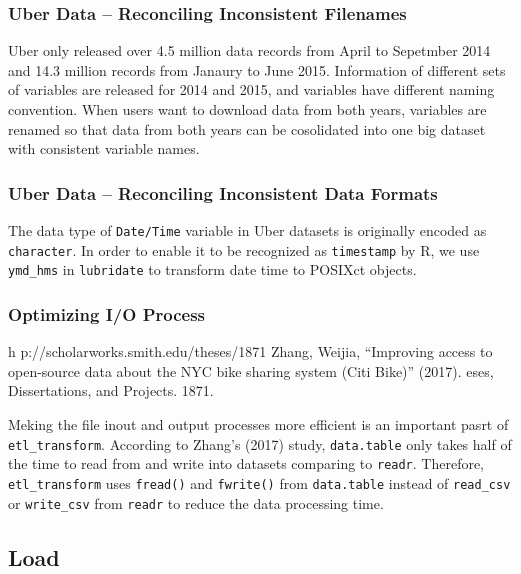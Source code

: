 \documentclass[12pt,twoside]{reedthesis}
\theoremstyle{definition}
\theoremstyle{definition}
\theoremstyle{definition}
\theoremstyle{remark}
\begin{document}
\subsubsection{Uber Data -- Reconciling Inconsistent
Filenames}\label{uber-data-reconciling-inconsistent-filenames}

Uber only released over 4.5 million data records from April to Sepetmber
2014 and 14.3 million records from Janaury to June 2015. Information of
different sets of variables are released for 2014 and 2015, and
variables have different naming convention. When users want to download
data from both years, variables are renamed so that data from both years
can be cosolidated into one big dataset with consistent variable names.

\subsubsection{Uber Data -- Reconciling Inconsistent Data
Formats}\label{uber-data-reconciling-inconsistent-data-formats}

The data type of \texttt{Date/Time} variable in Uber datasets is
originally encoded as \texttt{character}. In order to enable it to be
recognized as \texttt{timestamp} by R, we use \texttt{ymd\_hms} in
\texttt{lubridate} to transform date time to POSIXct objects.

\subsubsection{Optimizing I/O Process}\label{optimizing-io-process}

h p://scholarworks.smith.edu/theses/1871 Zhang, Weijia, ``Improving
access to open-source data about the NYC bike sharing system (Citi
Bike)'' (2017). eses, Dissertations, and Projects. 1871.

Meking the file inout and output processes more efficient is an
important pasrt of \texttt{etl\_transform}. According to Zhang's (2017)
study, \texttt{data.table} only takes half of the time to read from and
write into datasets comparing to \texttt{readr}. Therefore,
\texttt{etl\_transform} uses \texttt{fread()} and \texttt{fwrite()} from
\texttt{data.table} instead of \texttt{read\_csv} or \texttt{write\_csv}
from \texttt{readr} to reduce the data processing time.

\subsection{Load}\label{load}
\end{document}
